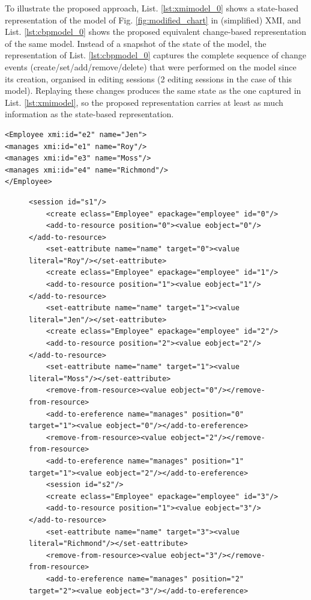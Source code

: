 \documentclass[12pt, a4paper]{report} \usepackage[titletoc]{appendix}
\begin{document}
To illustrate the proposed approach, List. \ref{lst:xmimodel_0} shows a state-based representation of the model of Fig. \ref{fig:modified_chart} in (simplified) XMI, and List. \ref{lst:cbpmodel_0} shows the proposed equivalent change-based representation of the same model. Instead of a snapshot of the state of the model, the representation of List. \ref{lst:cbpmodel_0} captures the complete sequence of change events (create/set/add/remove/delete) that were performed on the model since its creation, organised in editing sessions (2 editing sessions in the case of this model). Replaying these changes produces the same state as the one captured in List. \ref{lst:xmimodel}, so the proposed representation carries at least as much information as the state-based representation.

\begin{lstlisting}[style=xmi,caption={State-based representation of the model of Figure \ref{fig:modified_chart} in (simplified) XMI.},label=lst:xmimodel_0]
<Employee xmi:id="e2" name="Jen">
<manages xmi:id="e1" name="Roy"/>
<manages xmi:id="e3" name="Moss"/>
<manages xmi:id="e4" name="Richmond"/>
</Employee>
\end{lstlisting}

\begin{figure}[h]
	\begin{lstlisting}[style=xml,caption={Change-based representation of the model of Figure \ref{fig:modified_chart}.},label=lst:cbpmodel_0]
	<session id="s1"/>
	<create eclass="Employee" epackage="employee" id="0"/>
	<add-to-resource position="0"><value eobject="0"/></add-to-resource>
	<set-eattribute name="name" target="0"><value literal="Roy"/></set-eattribute>
	<create eclass="Employee" epackage="employee" id="1"/>
	<add-to-resource position="1"><value eobject="1"/></add-to-resource>
	<set-eattribute name="name" target="1"><value literal="Jen"/></set-eattribute>
	<create eclass="Employee" epackage="employee" id="2"/>
	<add-to-resource position="2"><value eobject="2"/></add-to-resource>
	<set-eattribute name="name" target="1"><value literal="Moss"/></set-eattribute>
	<remove-from-resource><value eobject="0"/></remove-from-resource>
	<add-to-ereference name="manages" position="0" target="1"><value eobject="0"/></add-to-ereference>
	<remove-from-resource><value eobject="2"/></remove-from-resource>
	<add-to-ereference name="manages" position="1" target="1"><value eobject="2"/></add-to-ereference>
	<session id="s2"/>
	<create eclass="Employee" epackage="employee" id="3"/>
	<add-to-resource position="1"><value eobject="3"/></add-to-resource>
	<set-eattribute name="name" target="3"><value literal="Richmond"/></set-eattribute>
	<remove-from-resource><value eobject="3"/></remove-from-resource>
	<add-to-ereference name="manages" position="2" target="2"><value eobject="3"/></add-to-ereference>
	\end{lstlisting}
\end{figure}
\end{document}
